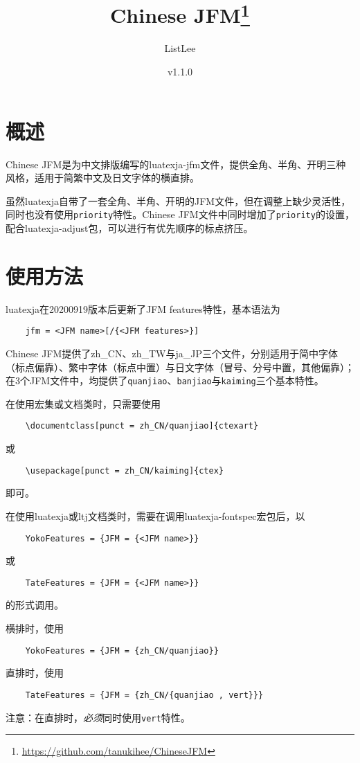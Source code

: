 \documentclass[a4paper , zihao=-4 , fontset=adobe , punct=zh_CN/kaiming]{ctexart}
\title{\textbf{\textsf{Chinese JFM}}\thanks{\url{https://github.com/tanukihee/ChineseJFM}}}
\author{ListLee}
\date{\zhtoday \qquad v1.1.0}
\begin{document}
\maketitle

\section{概述}
\textsf{Chinese JFM}是为中文排版编写的luatexja-jfm文件，提供全角、半角、开明三种风格，适用于简繁中文及日文字体的横直排。

虽然\textsf{luatexja}自带了一套全角、半角、开明的JFM文件，但在调整上缺少灵活性，同时也没有使用\+\verb|priority|特性。\textsf{Chinese JFM}文件中同时增加了\+\verb|priority|的设置，配合\textsf{luatexja-adjust}包，可以进行有优先顺序的标点挤压。\label{sec:pr}

\section{使用方法}
\textsf{luatexja}在20200919版本后更新了JFM features特性，基本语法为
\begin{verbatim}
    jfm = <JFM name>[/{<JFM features>}]
\end{verbatim}

\textsf{Chinese JFM}提供了\textsf{zh\_CN}、\textsf{zh\_TW}与\textsf{ja\_JP}三个文件，分别适用于简中字体（标点偏靠）、繁中字体（标点中置）与日文字体（冒号、分号中置，其他偏靠）；在3个JFM文件中，均提供了\+\verb|quanjiao|、\verb|banjiao|与\+\verb|kaiming|三个基本特性。

在使用\CTeX{}宏集或文档类时，只需要使用
\begin{verbatim}
    \documentclass[punct = zh_CN/quanjiao]{ctexart}
\end{verbatim}
或
\begin{verbatim}
    \usepackage[punct = zh_CN/kaiming]{ctex}
\end{verbatim}
即可。

在使用\textsf{luatexja}或\textsf{ltj}文档类时，需要在调用\textsf{luatexja-fontspec}宏包后，以\begin{verbatim}
    YokoFeatures = {JFM = {<JFM name>}}
\end{verbatim}
或
\begin{verbatim}
    TateFeatures = {JFM = {<JFM name>}}
\end{verbatim}
的形式调用。

横排时，使用
\begin{verbatim}
    YokoFeatures = {JFM = {zh_CN/quanjiao}}
\end{verbatim}
直排时，使用
\begin{verbatim}
    TateFeatures = {JFM = {zh_CN/{quanjiao , vert}}}
\end{verbatim}
{\color{red}注意：在直排时，\emph{必须}同时使用\+\verb|vert|特性。}
\end{document}
